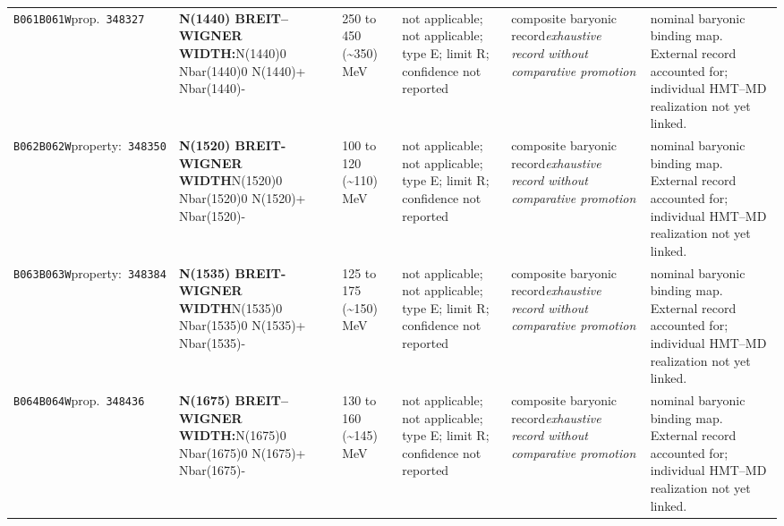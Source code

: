 \begin{landscape}
\begin{longtable}{L{1.85cm}L{4.45cm}L{2.35cm}L{4.05cm}L{3.35cm}L{7.15cm}}
\texttt{B061}\newline \texttt{B061W}\newline prop.\ \texttt{348327} & \textbf{N(1440) BREIT--WIGNER WIDTH:}\newline N(1440)0 \textbar{}\allowbreak{} Nbar(1440)0 \textbar{}\allowbreak{} N(1440)+ \textbar{}\allowbreak{} Nbar(1440)- & 250 to 450 (\textasciitilde{}350)\,MeV & not applicable; not applicable; type E; limit R; confidence not reported & composite baryonic record\newline \emph{exhaustive record without comparative promotion} & nominal baryonic binding map. External record accounted for; individual HMT--MD realization not yet linked. \\
\texttt{B062}\newline \texttt{B062W}\newline property:\ \texttt{348350} & \textbf{N(1520) BREIT-WIGNER WIDTH}\newline N(1520)0 \textbar{}\allowbreak{} Nbar(1520)0 \textbar{}\allowbreak{} N(1520)+ \textbar{}\allowbreak{} Nbar(1520)- & 100 to 120 (\textasciitilde{}110)\,MeV & not applicable; not applicable; type E; limit R; confidence not reported & composite baryonic record\newline \emph{exhaustive record without comparative promotion} & nominal baryonic binding map. External record accounted for; individual HMT--MD realization not yet linked. \\
\texttt{B063}\newline \texttt{B063W}\newline property:\ \texttt{348384} & \textbf{N(1535) BREIT-WIGNER WIDTH}\newline N(1535)0 \textbar{}\allowbreak{} Nbar(1535)0 \textbar{}\allowbreak{} N(1535)+ \textbar{}\allowbreak{} Nbar(1535)- & 125 to 175 (\textasciitilde{}150)\,MeV & not applicable; not applicable; type E; limit R; confidence not reported & composite baryonic record\newline \emph{exhaustive record without comparative promotion} & nominal baryonic binding map. External record accounted for; individual HMT--MD realization not yet linked. \\
\texttt{B064}\newline \texttt{B064W}\newline prop.\ \texttt{348436} & \textbf{N(1675) BREIT--WIGNER WIDTH:}\newline N(1675)0 \textbar{}\allowbreak{} Nbar(1675)0 \textbar{}\allowbreak{} N(1675)+ \textbar{}\allowbreak{} Nbar(1675)- & 130 to 160 (\textasciitilde{}145)\,MeV & not applicable; not applicable; type E; limit R; confidence not reported & composite baryonic record\newline \emph{exhaustive record without comparative promotion} & nominal baryonic binding map. External record accounted for; individual HMT--MD realization not yet linked. \\

\end{longtable}
\end{landscape}
